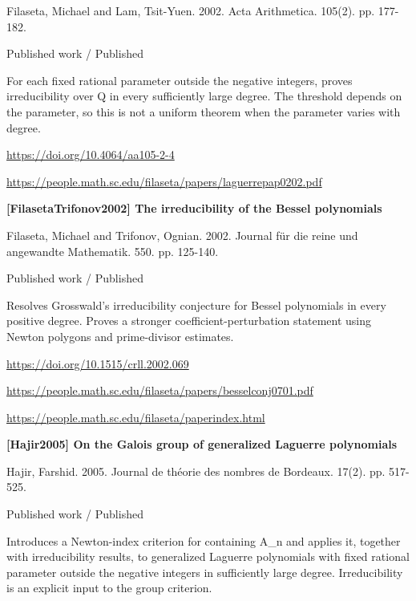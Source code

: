 \documentclass[11pt,a4paper,oneside,openany]{book}
\begin{document}
\color{black} Filaseta, Michael and Lam, Tsit-Yuen. 2002. Acta Arithmetica. 105(2). pp. 177-182.\par
{\small\sffamily\color{atlasgold}Published work / Published}\par
\color{black} For each fixed rational parameter outside the negative integers, proves irreducibility over Q in every sufficiently large degree. The threshold depends on the parameter, so this is not a uniform theorem when the parameter varies with degree.\par
{\footnotesize\url{https://doi.org/10.4064/aa105-2-4}}\par
{\footnotesize\url{https://people.math.sc.edu/filaseta/papers/laguerrepap0202.pdf}}\par
\vspace{9pt}
\hypertarget{ref:FilasetaTrifonov2002}{}
{\sffamily\bfseries\color{atlasgreen}[FilasetaTrifonov2002] The irreducibility of the Bessel polynomials}\par
\color{black} Filaseta, Michael and Trifonov, Ognian. 2002. Journal für die reine und angewandte Mathematik. 550. pp. 125-140.\par
{\small\sffamily\color{atlasgold}Published work / Published}\par
\color{black} Resolves Grosswald's irreducibility conjecture for Bessel polynomials in every positive degree. Proves a stronger coefficient-perturbation statement using Newton polygons and prime-divisor estimates.\par
{\footnotesize\url{https://doi.org/10.1515/crll.2002.069}}\par
{\footnotesize\url{https://people.math.sc.edu/filaseta/papers/besselconj0701.pdf}}\par
{\footnotesize\url{https://people.math.sc.edu/filaseta/paperindex.html}}\par
\vspace{9pt}
\hypertarget{ref:Hajir2005}{}
{\sffamily\bfseries\color{atlasgreen}[Hajir2005] On the Galois group of generalized Laguerre polynomials}\par
\color{black} Hajir, Farshid. 2005. Journal de théorie des nombres de Bordeaux. 17(2). pp. 517-525.\par
{\small\sffamily\color{atlasgold}Published work / Published}\par
\color{black} Introduces a Newton-index criterion for containing A\_\allowbreak{}n and applies it, together with irreducibility results, to generalized Laguerre polynomials with fixed rational parameter outside the negative integers in sufficiently large degree. Irreducibility is an explicit input to the group criterion.\par
\end{document}

